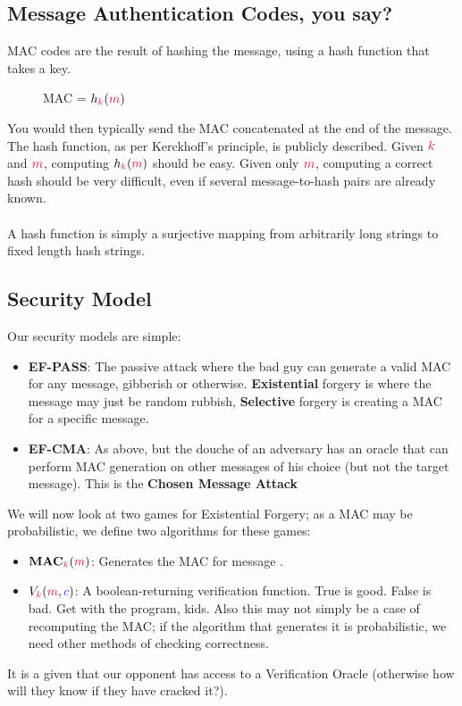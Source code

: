     \subsection{\textbf{M}essage \textbf{A}uthentication \textbf{C}odes, you say?}
    MAC codes are the result of hashing the message, using a hash function that takes a key.
    \begin{figure}[htp!]
        \centering
        MAC = $h_{\ck}(\cm)$
    \end{figure}
    You would then typically send the MAC concatenated at the end of the message. The hash function, as per Kerckhoff's principle, is publicly described. Given $\ck$ and $\cm$, computing $h_{\ck}(\cm)$ should be easy.
    Given only $\cm$, computing a correct hash should be very difficult, even if several message-to-hash pairs are already known.\\
    \\
    A hash function is simply a surjective mapping from arbitrarily long strings to fixed length hash strings.

    \subsection{Security Model}
    Our security models are simple:
    \begin{itemize}
        \item \textbf{EF-PASS}: The passive attack where the bad guy can generate a valid MAC for any message, gibberish or otherwise. 
        \textbf{Existential} forgery is where the message may just be random rubbish, \textbf{Selective} forgery is creating a MAC for a specific message.

        \item \textbf{EF-CMA}: As above, but the douche of an adversary has an oracle that can perform MAC generation on other messages of his choice (but not the target message). This is the \textbf{Chosen Message Attack}
    \end{itemize}
    We will now look at two games for Existential Forgery; as a MAC may be probabilistic, we define two algorithms for these games:

    \begin{itemize}
        \item $\textbf{MAC}_{\ck}(\cm)$: Generates the MAC for message \emph{\cm}.
        \item $V_{\ck}(\cm, \cc)$: A boolean-returning verification function. True is good. False is bad. Get with the program, kids. Also this may not simply be a case of recomputing the MAC; if the algorithm that generates it is probabilistic, we need other methods of checking correctness.
    \end{itemize}
    It is a given that our opponent has access to a Verification Oracle (otherwise how will they know if they have cracked it?). 

